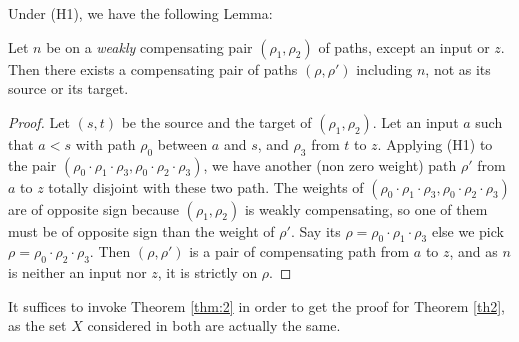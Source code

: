 Under (H1), we have the following Lemma:

\begin{lemma}
  Let $n$ be on a {\em weakly} compensating pair $(\rho_1,\rho_2)$ of paths, 
  except an input or $z$. Then there exists a compensating pair of paths 
 $(\rho,\rho')$ including $n$, not as its source or its target.
\end{lemma}

\begin{proof}
Let $(s,t)$ be the source and the target of $(\rho_1,\rho_2)$.
Let an input $a$ such that $a<s$ with path $\rho_0$ between $a$ and $s$,
and $\rho_3$  from $t$ to $z$.
Applying (H1) to the pair 
$(\rho_0 \cdot \rho_1 \cdot \rho_3, \rho_0\cdot \rho_2 \cdot \rho_3)$, 
we have another (non zero weight) path $\rho'$ from $a$ to $z$ totally disjoint with these two path.
The weights of $(\rho_0 \cdot \rho_1 \cdot \rho_3, \rho_0\cdot \rho_2 \cdot \rho_3)$
are of opposite sign because $(\rho_1,\rho_2)$ is weakly compensating, so one of them must be of opposite sign than the weight of $\rho'$. Say its $\rho = \rho_0 \cdot \rho_1 \cdot \rho_3$
else we pick $\rho=\rho_0\cdot \rho_2 \cdot \rho_3$.
Then $(\rho,\rho')$ is a pair of compensating path from $a$ to $z$, and as $n$ is neither an input nor $z$, it is strictly on $\rho$.
\end{proof}

It suffices to invoke Theorem \ref{thm:2} in order to get the proof for Theorem \ref{th2},
as the set $X$ considered in both are actually the same.

















































